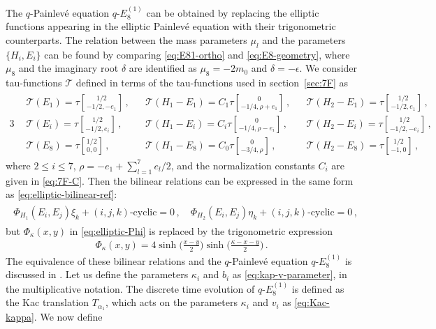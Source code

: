 \documentclass[11pt, a4paper]{article}
\newcommand{\tauftn}[2]{\tau\genfrac[]{0pt}{1}{#1}{#2}}
\theoremstyle{definition}
\begin{document}
The $ q $-Painlev\'e equation $ q\text{-}E_8^{(1)} $ can be obtained by replacing the elliptic functions appearing in the elliptic Painlev\'e equation with their trigonometric counterparts. The relation between the mass parameters $ \mu_l $ and the parameters $ \{H_i, E_i\} $ can be found by comparing \eqref{eq:E81-ortho} and \eqref{eq:E8-geometry}, where $ \mu_8 $ and the imaginary root $ \delta $ are identified as $ \mu_8 = -2m_0 $ and $ \delta=-\epsilon $. We consider tau-functions $ \mathcal{T} $ defined in terms of the tau-functions used in section~\ref{sec:7F} as
\begin{alignat}{3}
    \begin{aligned}
        &\mathcal{T}(E_1) = \tauftn{1/2}{-1/2, -e_1} \, , \!
        &&\mathcal{T}(H_1-E_1) = C_1 \tauftn{0}{-1/4, \rho+e_1} \, , \!
        &&\mathcal{T}(H_2-E_1) = \tauftn{1/2}{-1/2,e_1} \, , \\
        &\mathcal{T}(E_i) = \tauftn{1/2}{-1/2, e_i} \, ,  \!
        &&\mathcal{T}(H_1-E_i) = C_i \tauftn{0}{-1/4, \rho-e_i} \, , \!
        &&\mathcal{T}(H_2-E_i) = \tauftn{1/2}{-1/2,-e_i} \, , \\
        &\mathcal{T}(E_8) = \tauftn{1/2}{0, 0} \, , \!
        &&\mathcal{T}(H_1-E_8) = C_0 \tauftn{0}{-3/4, \rho} \, ,  \!
        &&\mathcal{T}(H_2-E_8) = \tauftn{1/2}{-1,0} \, ,
    \end{aligned}
\end{alignat}
where $ 2\leq i \leq 7 $, $ \rho = -e_1+\sum_{l=1}^7 e_l/2 $, and the normalization constants $ C_i $ are given in \eqref{eq:7F-C}. Then the bilinear relations can be expressed in the same form as \eqref{eq:elliptic-bilinear-ref}:
\begin{align}
    \begin{aligned}
        \Phi_{H_1}(E_i, E_j) \xi_k + (i, j, k)\text{-cyclic} = 0 \, , \quad
        \Phi_{H_2}(E_i, E_j) \eta_k + (i, j, k)\text{-cyclic} = 0 \, ,
    \end{aligned}
\end{align}
but $ \Phi_\kappa(x,y) $ in \eqref{eq:elliptic-Phi} is replaced by the trigonometric expression 
\begin{align}\label{eq:Phi-tri}
    \Phi_{\kappa}(x,y) = 4\sinh\Big(\frac{x-y}{2}\Big) \sinh\Big(\frac{\kappa-x-y}{2}\Big) \, .
\end{align}
The equivalence of these bilinear relations and the $ q $-Painlev\'e equation $ q\text{-}E_8^{(1)} $ is discussed in \cite{Masuda:2011, Kajiwara:2015}. Let us define the parameters $ \kappa_i $ and $ b_i $ as \eqref{eq:kap-v-parameter}, in the multiplicative notation. The discrete time evolution of $ q\text{-}E_8^{(1)} $ is defined as the Kac translation $ T_{\alpha_1} $, which acts on the parameters $ \kappa_i $ and $ v_i $ as \eqref{eq:Kac-kappa}. We now define
\end{document}
